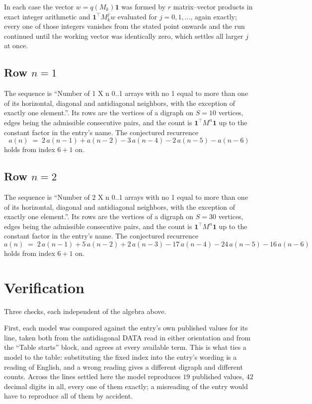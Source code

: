 \documentclass[11pt,a4paper]{article}
\theoremstyle{plain}
\theoremstyle{definition}
\begin{document}
In each case the vector $w=q(M_k)\mathbf{1}$ was formed by $r$ matrix--vector products in
exact integer arithmetic and $\mathbf{1}^{\!\top}M_k^{j}w$ evaluated for $j=0,1,\dots$,
again exactly; every one of those integers vanishes from the stated point onwards and the run
continued until the working vector was identically zero, which settles all larger $j$ at once.

\subsection*{Row $n$$=1$}
The sequence is ``Number of 1 X n 0..1 arrays with no 1 equal to more than one of its horizontal, diagonal and antidiagonal neighbors, with the exception of exactly one element.''. Its rows are the vertices of a digraph on
$S=10$ vertices, edges being the admissible consecutive pairs, and the count is
$\mathbf{1}^{\!\top}M^{n}\mathbf{1}$ up to the constant factor in the entry's name.
The conjectured recurrence
\[
a(n)\;=\;2\,a(n-1) + a(n-2) - 3\,a(n-4) - 2\,a(n-5) - a(n-6)
\]
holds from index $6+1$ on.

\subsection*{Row $n$$=2$}
The sequence is ``Number of 2 X n 0..1 arrays with no 1 equal to more than one of its horizontal, diagonal and antidiagonal neighbors, with the exception of exactly one element.''. Its rows are the vertices of a digraph on
$S=30$ vertices, edges being the admissible consecutive pairs, and the count is
$\mathbf{1}^{\!\top}M^{n}\mathbf{1}$ up to the constant factor in the entry's name.
The conjectured recurrence
\[
a(n)\;=\;2\,a(n-1) + 5\,a(n-2) + 2\,a(n-3) - 17\,a(n-4) - 24\,a(n-5) - 16\,a(n-6)
\]
holds from index $6+1$ on.

\section{Verification}

Three checks, each independent of the algebra above.

First, each model was compared against the entry's own published values for its line, taken
both from the antidiagonal DATA read in either orientation and from the ``Table starts''
block, and agrees at every available term. This is what ties a model to the table:
substituting the fixed index into the entry's wording is a reading of English, and a wrong
reading gives a different digraph and different counts. Across the lines settled here the
model reproduces $19$ published values, $42$ decimal digits in all, every one of
them exactly; a misreading of the entry would have to reproduce all of them by accident.
\end{document}
